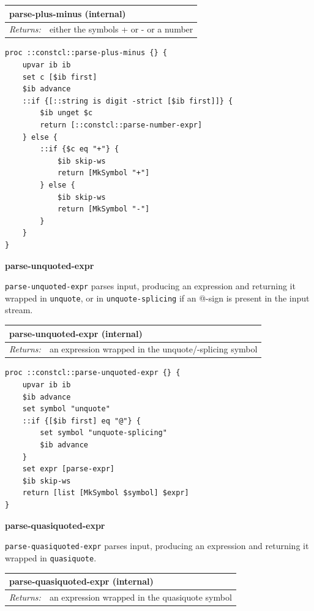 \documentclass[twoside,9pt]{report}
\begin{document}
\begin{tabular}{ |l l| }
\hline
\multicolumn{2}{|l|}{parse-plus-minus (internal)} \\
\hline
\textit{Returns:} & either the symbols + or - or a number \\
\hline
\end{tabular}

\noindent\makebox[\linewidth]{\rule{\linewidth}{0.4pt}}
\begin{lstlisting}
proc ::constcl::parse-plus-minus {} {
    upvar ib ib
    set c [$ib first]
    $ib advance
    ::if {[::string is digit -strict [$ib first]]} {
        $ib unget $c
        return [::constcl::parse-number-expr]
    } else {
        ::if {$c eq "+"} {
            $ib skip-ws
            return [MkSymbol "+"]
        } else {
            $ib skip-ws
            return [MkSymbol "-"]
        }
    }
}
\end{lstlisting}
\noindent\makebox[\linewidth]{\rule{\linewidth}{0.4pt}}

\textbf{parse-unquoted-expr}


\texttt{parse-unquoted-expr} parses input, producing an expression and returning it wrapped in \texttt{unquote}, or in \texttt{unquote-splicing} if an @-sign is present in the input stream.

\begin{tabular}{ |l l| }
\hline
\multicolumn{2}{|l|}{parse-unquoted-expr (internal)} \\
\hline
\textit{Returns:} & an expression wrapped in the unquote/-splicing symbol \\
\hline
\end{tabular}

\noindent\makebox[\linewidth]{\rule{\linewidth}{0.4pt}}
\begin{lstlisting}
proc ::constcl::parse-unquoted-expr {} {
    upvar ib ib
    $ib advance
    set symbol "unquote"
    ::if {[$ib first] eq "@"} {
        set symbol "unquote-splicing"
        $ib advance
    }
    set expr [parse-expr]
    $ib skip-ws
    return [list [MkSymbol $symbol] $expr]
}
\end{lstlisting}
\noindent\makebox[\linewidth]{\rule{\linewidth}{0.4pt}}

\textbf{parse-quasiquoted-expr}


\texttt{parse-quasiquoted-expr} parses input, producing an expression and returning it wrapped in \texttt{quasiquote}.

\begin{tabular}{ |l l| }
\hline
\multicolumn{2}{|l|}{parse-quasiquoted-expr (internal)} \\
\hline
\textit{Returns:} & an expression wrapped in the quasiquote symbol \\
\hline
\end{tabular}
\end{document}
